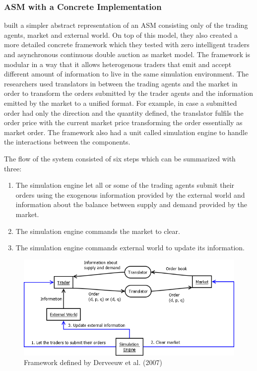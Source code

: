 \subsubsection{ASM with a Concrete Implementation}
\citet{Julien07} built a simpler abstract representation of an ASM consisting
only of the trading agents, market and external world. On top of this model, 
they also created a more detailed concrete framework which they tested with
zero intelligent traders and asynchronous continuous double auction as market
model. The framework is modular in a way that it allows heterogenous traders
that emit and accept different amount of information to live in the same 
simulation environment. The researchers used translators in between the 
trading agents and the market in order to transform the orders submitted by
the trader agents and the information emitted by the market to a unified format.
For example, in case a submitted order had only the direction and the quantity 
defined, the translator fulfils the order price with the current market price 
transforming the order essentially as market order. The framework also had a
unit called simulation engine to handle the interactions between the components.

The flow of the system consisted of six steps which can be summarized with three:
\begin{enumerate}
    \item The simulation engine let all or some of the trading agents submit their orders 
            using the exogenous information provided by the external world and 
            information about the balance between supply and demand provided by the market.
    \item The simulation engine commands the market to clear.
    \item The simulation engine commands external world to update its information.
\end{enumerate}


\begin{figure}
    \includegraphics[width=\linewidth]{diagrams/julien_market.png}
    \caption{Framework defined by Derveeuw et al. (2007)}
\end{figure}

